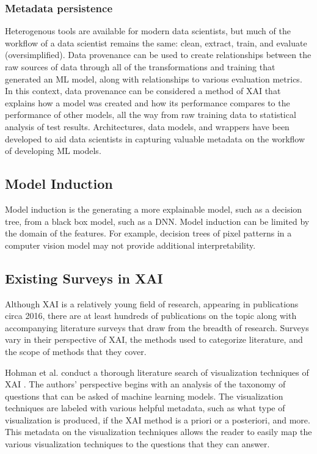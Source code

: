 \documentclass{IEEEtran}
\begin{document}
\subsubsection{Metadata persistence} Heterogenous tools are available for modern data scientists, but much of the workflow of a data scientist remains the same:  clean, extract, train, and evaluate (oversimplified).  Data provenance can be used to create relationships between the raw sources of data through all of the transformations and training that generated an ML model, along with relationships to various evaluation metrics.  In this context, data provenance can be considered a method of XAI that explains how a model was created and how its performance compares to the performance of other models, all the way from raw training data to statistical analysis of test results.  Architectures, data models, and wrappers have been developed to aid data scientists in capturing valuable metadata on the workflow of developing ML models.

\subsection{Model Induction}

Model induction is the generating a more explainable model, such as a decision tree, from a black box model, such as a DNN.  Model induction can be limited by the domain of the features.  For example, decision trees of pixel patterns in a computer vision model may not provide additional interpretability.

\subsection{Existing Surveys in XAI}

Although XAI is a relatively young field of research, appearing in publications circa 2016, there are at least hundreds of publications on the topic along with accompanying literature surveys that draw from the breadth of research.  Surveys vary in their perspective of XAI, the methods used to categorize literature, and the scope of methods that they cover.

Hohman et al. conduct a thorough literature search of visualization techniques of XAI \cite{Hohman2018}.  The authors' perspective begins with an analysis of the taxonomy of questions that can be asked of machine learning models.  The visualization techniques are labeled with various helpful metadata, such as what type of visualization is produced, if the XAI method is a priori or a posteriori, and more.  This metadata on the visualization techniques allows the reader to easily map the various visualization techniques to the questions that they can answer.
\end{document}
